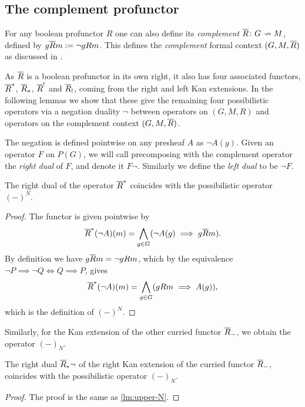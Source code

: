 \subsection{The complement profunctor}

For any boolean profunctor $R$ one can also define its \emph{complement} $\overline{R}\colon G\nrightarrow M$, defined by $g\overline{R} m := \neg gRm$. This defines the \emph{complement} formal context $(G,M,\overline{R})$ as discussed in \cite{djouadi_prade_2011,yakub-djouadi-dubois-prade_2016}. 

As $\overline{R}$ is a boolean profunctor in its own right, it also has four associated functors, $\overline{R}^*$, $\overline{R}_*$, $\overline{R}^!$ and $\overline{R}_!$, coming from the right and left Kan extensions. In the following lemmas we show that these give the remaining four possibilistic operators via a negation duality $\neg$ between operators on $(G,M,R)$ and operators on the complement context $(G,M,\overline{R})$. 

The negation is defined pointwise on any presheaf $A$ as $\neg A(g)$. Given an operator $F$ on $P(G)$, we will call precomposing with the complement operator the \emph{right dual} of $F$, and denote it $F\neg$. Similarly we define the \emph{left dual} to be $\neg F$. 

\begin{lemma}
    \label{lm:upper-N}
    The right dual of the operator $\overline{R}^*$ coincides with the possibilistic operator $(-)^N$. 
\end{lemma}
\begin{proof}
    The functor is given pointwise by 
    \[\overline{R}^*(\neg A)(m) = \bigwedge_{g\in G}(\neg A(g)\implies g\overline{R} m).\] 
    By definition we have $g\overline{R} m = \neg gRm$, which by the equivalence $\neg P\implies \neg Q \iff Q\implies P$, gives 
    \[\overline{R}^*(\neg A)(m) = \bigwedge_{g\in G}(gRm \implies A(g)),\]
    which is the definition of $(-)^N$. 
    \end{proof}

Similarly, for the Kan extension of the other curried functor $\overline{R}_-$, we obtain the operator $(-)_N$.

\begin{lemma}
    \label{lm:lower-N}
    The right dual $\overline{R}_*\neg$ of the right Kan extension of the curried functor $\overline{R}_-$, coincides with the possibilistic operator $(-)_N$.
\end{lemma}
\begin{proof}
    The proof is the same as \cref{lm:upper-N}. 
\end{proof}

